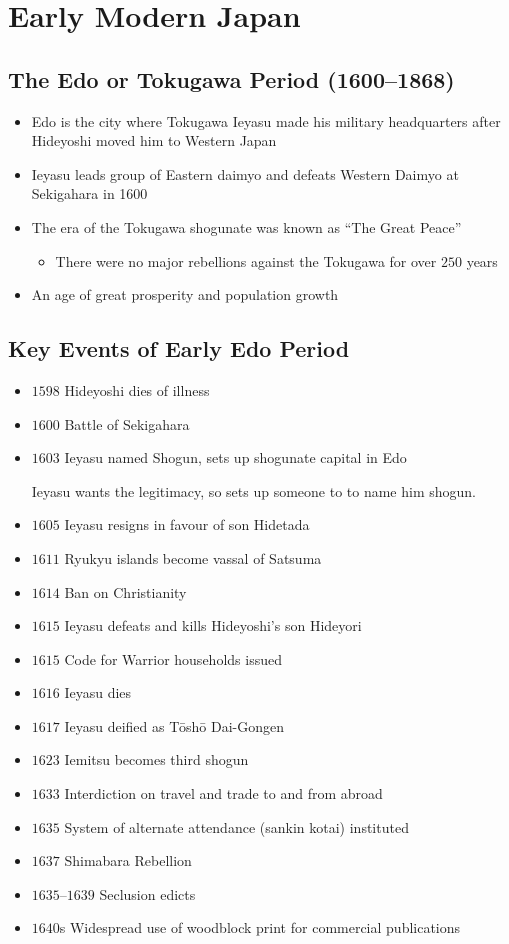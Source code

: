 \documentclass[class=article, crop=false]{standalone}
\begin{document}
  \section{Early Modern Japan}
  \subsection{The Edo or Tokugawa Period (1600--1868)}
  \begin{itemize}
    \item Edo is the city where Tokugawa Ieyasu made his military headquarters after Hideyoshi moved him to Western Japan
    \item Ieyasu leads group of Eastern daimyo and defeats Western Daimyo at Sekigahara in 1600
    \item The era of the Tokugawa shogunate was known as ``The Great Peace''
    \begin{itemize}
      \item There were no major rebellions against the Tokugawa for over $250$ years
    \end{itemize}
    \item An age of great prosperity and population growth
  \end{itemize}
  \subsection{Key Events of Early Edo Period}
  \begin{itemize}
    \item $1598$ Hideyoshi dies of illness
    \item $1600$ Battle of Sekigahara
    \item $1603$ Ieyasu named Shogun, sets up shogunate capital in Edo
    \begin{note}{}
      Ieyasu wants the legitimacy, so sets up someone to to name him shogun.
    \end{note}
    \item $1605$ Ieyasu resigns in favour of son Hidetada
    \item $1611$ Ryukyu islands become vassal of Satsuma
    \item $1614$ Ban on Christianity
    \item $1615$ Ieyasu defeats and kills Hideyoshi's son Hideyori
    \item $1615$ Code for Warrior households issued
    \item $1616$ Ieyasu dies
    \item $1617$ Ieyasu deified as T\=osh\=o Dai-Gongen
    \item $1623$ Iemitsu becomes third shogun
    \item $1633$ Interdiction on travel and trade to and from abroad
    \item $1635$ System of alternate attendance (sankin kotai) instituted
    \item $1637$ Shimabara Rebellion
    \item $1635$--$1639$ Seclusion edicts
    \item $1640$s Widespread use of woodblock print for commercial publications
  \end{itemize}
\end{document}
